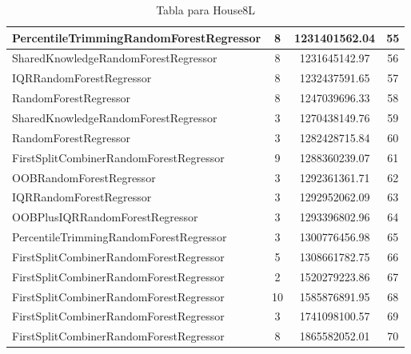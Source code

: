\begin{table}[h]
\begin{tabular}{|l|c|c|c|}
\textcolor[HTML]{f46a9b}{PercentileTrimmingRandomForestRegressor} & 8 & 1231401562.04 & 55 \\ \hline
\textcolor[HTML]{ef9b20}{SharedKnowledgeRandomForestRegressor} & 8 & 1231645142.97 & 56 \\ \hline
\textcolor[HTML]{27aeef}{IQRRandomForestRegressor} & 8 & 1232437591.65 & 57 \\ \hline
\textcolor[HTML]{87bc45}{RandomForestRegressor} & 8 & 1247039696.33 & 58 \\ \hline
\textcolor[HTML]{ef9b20}{SharedKnowledgeRandomForestRegressor} & 3 & 1270438149.76 & 59 \\ \hline
\textcolor[HTML]{87bc45}{RandomForestRegressor} & 3 & 1282428715.84 & 60 \\ \hline
\textcolor[HTML]{ea5545}{FirstSplitCombinerRandomForestRegressor} & 9 & 1288360239.07 & 61 \\ \hline
\textcolor[HTML]{b33dc6}{OOBRandomForestRegressor} & 3 & 1292361361.71 & 62 \\ \hline
\textcolor[HTML]{27aeef}{IQRRandomForestRegressor} & 3 & 1292952062.09 & 63 \\ \hline
\textcolor[HTML]{ede15b}{OOBPlusIQRRandomForestRegressor} & 3 & 1293396802.96 & 64 \\ \hline
\textcolor[HTML]{f46a9b}{PercentileTrimmingRandomForestRegressor} & 3 & 1300776456.98 & 65 \\ \hline
\textcolor[HTML]{ea5545}{FirstSplitCombinerRandomForestRegressor} & 5 & 1308661782.75 & 66 \\ \hline
\textcolor[HTML]{ea5545}{FirstSplitCombinerRandomForestRegressor} & 2 & 1520279223.86 & 67 \\ \hline
\textcolor[HTML]{ea5545}{FirstSplitCombinerRandomForestRegressor} & 10 & 1585876891.95 & 68 \\ \hline
\textcolor[HTML]{ea5545}{FirstSplitCombinerRandomForestRegressor} & 3 & 1741098100.57 & 69 \\ \hline
\textcolor[HTML]{ea5545}{FirstSplitCombinerRandomForestRegressor} & 8 & 1865582052.01 & 70 \\ \hline
\end{tabular}
\caption{Tabla para House8L}
\end{table}


